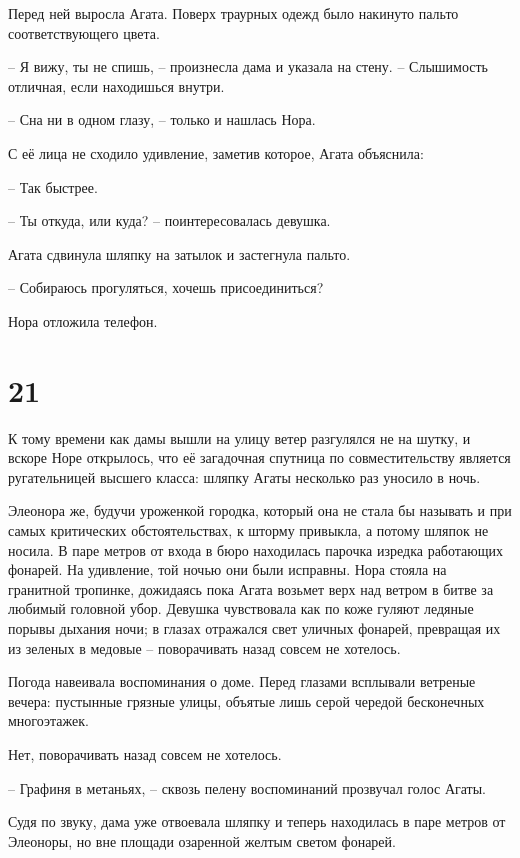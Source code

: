 \documentclass[
  a5paperpaper,
  DIV=11,
  numbers=noendperiod]{scrreprt}
\begin{document}
Перед ней выросла Агата. Поверх траурных одежд было накинуто пальто
соответствующего цвета.

-- Я вижу, ты не спишь, -- произнесла дама и указала на стену. --
Слышимость отличная, если находишься внутри.

-- Сна ни в одном глазу, -- только и нашлась Нора.

С её лица не сходило удивление, заметив которое, Агата объяснила:

-- Так быстрее.

-- Ты откуда, или куда? -- поинтересовалась девушка.

Агата сдвинула шляпку на затылок и застегнула пальто.

-- Собираюсь прогуляться, хочешь присоединиться?

Нора отложила телефон.

\section*{21}\label{21}


К тому времени как дамы вышли на улицу ветер разгулялся не на шутку, и
вскоре Норе открылось, что её загадочная спутница по совместительству
является ругательницей высшего класса: шляпку Агаты несколько раз
уносило в ночь.

Элеонора же, будучи уроженкой городка, который она не стала бы называть
и при самых критических обстоятельствах, к шторму привыкла, а потому
шляпок не носила. В паре метров от входа в бюро находилась парочка
изредка работающих фонарей. На удивление, той ночью они были исправны.
Нора стояла на гранитной тропинке, дожидаясь пока Агата возьмет верх над
ветром в битве за любимый головной убор. Девушка чувствовала как по коже
гуляют ледяные порывы дыхания ночи; в глазах отражался свет уличных
фонарей, превращая их из зеленых в медовые -- поворачивать назад совсем
не хотелось.

Погода навеивала воспоминания о доме. Перед глазами всплывали ветреные
вечера: пустынные грязные улицы, объятые лишь серой чередой бесконечных
многоэтажек.

Нет, поворачивать назад совсем не хотелось.

-- Графиня в метаньях, -- сквозь пелену воспоминаний прозвучал голос
Агаты.

Судя по звуку, дама уже отвоевала шляпку и теперь находилась в паре
метров от Элеоноры, но вне площади озаренной желтым светом фонарей.
\end{document}
